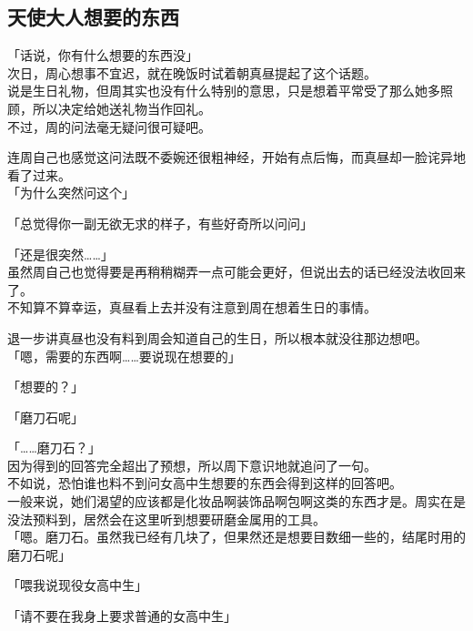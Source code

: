 \subsection{天使大人想要的东西}

「话说，你有什么想要的东西没」\\

次日，周心想事不宜迟，就在晚饭时试着朝真昼提起了这个话题。\\

说是生日礼物，但周其实也没有什么特别的意思，只是想着平常受了那么她多照顾，所以决定给她送礼物当作回礼。\\

不过，周的问法毫无疑问很可疑吧。

连周自己也感觉这问法既不委婉还很粗神经，开始有点后悔，而真昼却一脸诧异地看了过来。\\

「为什么突然问这个」

「总觉得你一副无欲无求的样子，有些好奇所以问问」

「还是很突然……」\\

虽然周自己也觉得要是再稍稍糊弄一点可能会更好，但说出去的话已经没法收回来了。\\

不知算不算幸运，真昼看上去并没有注意到周在想着生日的事情。

退一步讲真昼也没有料到周会知道自己的生日，所以根本就没往那边想吧。\\

「嗯，需要的东西啊……要说现在想要的」

「想要的？」

「磨刀石呢」

「……磨刀石？」\\

因为得到的回答完全超出了预想，所以周下意识地就追问了一句。\\

不如说，恐怕谁也料不到问女高中生想要的东西会得到这样的回答吧。\\

一般来说，她们渴望的应该都是化妆品啊装饰品啊包啊这类的东西才是。周实在是没法预料到，居然会在这里听到想要研磨金属用的工具。\\

「嗯。磨刀石。虽然我已经有几块了，但果然还是想要目数细一些的，结尾时用的磨刀石呢」

「喂我说现役女高中生」

「请不要在我身上要求普通的女高中生」\\

